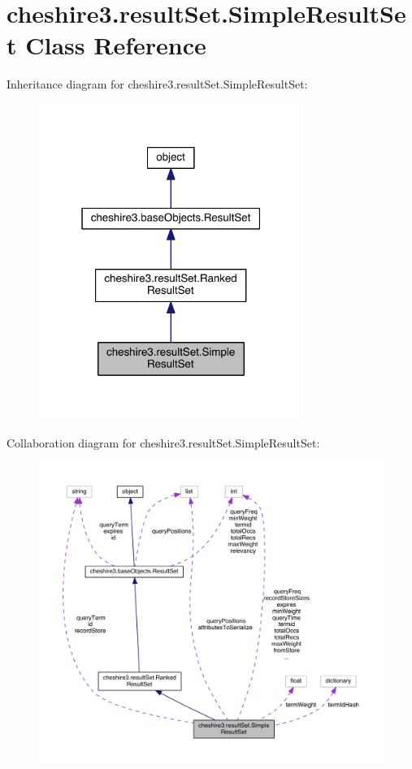 \hypertarget{classcheshire3_1_1result_set_1_1_simple_result_set}{\section{cheshire3.\-result\-Set.\-Simple\-Result\-Set Class Reference}
\label{classcheshire3_1_1result_set_1_1_simple_result_set}
}


Inheritance diagram for cheshire3.\-result\-Set.\-Simple\-Result\-Set\-:
\nopagebreak
\begin{figure}[H]
\begin{center}
\leavevmode
\includegraphics[width=244pt]{classcheshire3_1_1result_set_1_1_simple_result_set__inherit__graph}
\end{center}
\end{figure}


Collaboration diagram for cheshire3.\-result\-Set.\-Simple\-Result\-Set\-:
\nopagebreak
\begin{figure}[H]
\begin{center}
\leavevmode
\includegraphics[width=350pt]{classcheshire3_1_1result_set_1_1_simple_result_set__coll__graph}
\end{center}
\end{figure}
